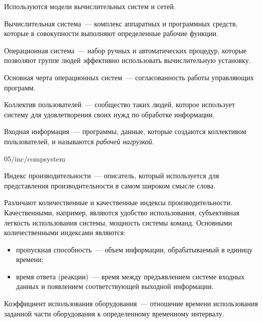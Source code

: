 Используются модели вычислительных систем и сетей.

\begin{dd}
    Вычислительная система~--- комплекс аппаратных и программных средств, которые в совокупности выполняют определенные рабочие функции.
\end{dd}

\begin{dd}
    Операционная система~--- набор ручных и автоматических процедур, которые позволяют группе людей эффективно использовать вычислительную установку.
\end{dd}

Основная черта операционных систем~--- согласованность работы управляющих программ.

\begin{dd}
    Коллектив пользователей~--- сообщество таких людей, которое использует систему для удовлетворения своих нужд по обработке информации.
\end{dd}

\begin{dd}
    Входная информация~--- программы, данные, которые создаются коллективом пользователей, и называются \textit{рабочей нагрузкой}.
\end{dd}

\image
{\textwidth}
{05/inc/compsystem}
{}

\begin{dd}
    Индекс производительности~--- описатель, который используется для представления производительности в самом широком смысле слова.
\end{dd}

Различают количественные и качественные индексы производительности. Качественными, например, являются удобство использования, субъективная легкость использования системы, мощность системы команд. Основными количественными индексами являются:

\begin{itemize}
    \item пропускная способность~--- объем информации, обрабатываемый в единицу времени;
    \item время ответа (реакции)~--- время между предъявлением системе входных данных и появлением соответствующей выходной информации.
\end{itemize}

\begin{dd}
    Коэффициент использования оборудования~--- отношение времени использования заданной части оборудования к определенному временному интервалу.
\end{dd}

